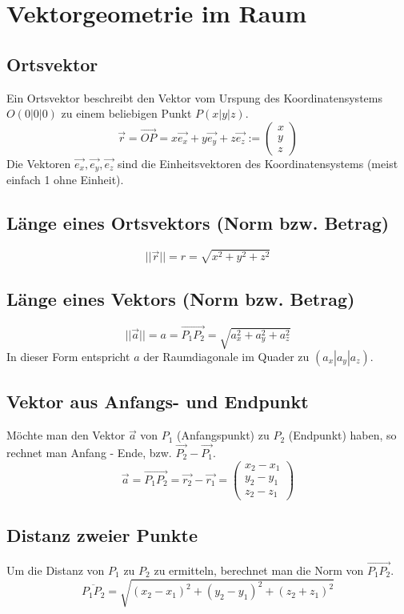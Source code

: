 \section{Vektorgeometrie im Raum}

\subsection{Ortsvektor}
Ein Ortsvektor beschreibt den Vektor vom Urspung des Koordinatensystems $O(0|0|0)$ zu einem beliebigen Punkt $P(x|y|z)$.
\[	\boxed{ \vec{r} = \overrightarrow{OP} = x\vec{e_x} + y\vec{e_y} + z\vec{e_z} :=
	\left( 
	  \begin{array}{ccc} 
	    x \\ y \\ z
	  \end{array}
	\right) }
\]
\noindent
Die Vektoren $\vec{e_x},\vec{e_y},\vec{e_z}$ sind die Einheitsvektoren des Koordinatensystems (meist einfach 1 ohne Einheit).
\subsection{Länge eines Ortsvektors (Norm bzw. Betrag)}
\[ \boxed{ ||\vec{r}|| = r = \sqrt{x^2 + y^2 + z^2} } \]

\subsection{Länge eines Vektors (Norm bzw. Betrag)}
\[ \boxed{ ||\vec{a}|| = a = \overrightarrow{P_1P_2} = \sqrt{a_x^2 + a_y^2 + a_z^2} } \]
In dieser Form entspricht $a$ der Raumdiagonale im Quader zu $(a_x|a_y|a_z)$.

\subsection{Vektor aus Anfangs- und Endpunkt}
Möchte man den Vektor $\vec{a}$ von $P_1$ (Anfangspunkt) zu $P_2$ (Endpunkt) haben, so rechnet man Anfang - Ende, bzw. $\vec{P_2} - \vec{P_1}$.
\[  \boxed{
    \vec{a} = \overrightarrow{P_1P_2} = \vec{r_2} - \vec{r_1} =
    \left( 
	  \begin{array}{ccc} 
	    x_2 - x_1 \\ y_2 - y_1 \\ z_2 - z_1
	  \end{array}
	\right)
    }
\]

\subsection{Distanz zweier Punkte}
Um die Distanz von $P_1$ zu $P_2$ zu ermitteln, berechnet man die Norm von $\overrightarrow{P_1P_2}$.
\[ \boxed{
   \overline{P_1P_2} = \sqrt{ (x_2 - x_1)^2 + (y_2 - y_1)^2 + (z_2 + z_1)^2 }
   }
\]

